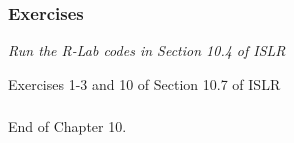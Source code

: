 \documentclass{beamer}
\begin{document}
                       
               
               
 
                      
      		\begin{frame}
      			\frametitle{Exercises  }
      			
      			
      			{\sl  Run the R-Lab codes in Section 10.4 of ISLR
      				
      				Exercises
      	 1-3  and 10 of Section  10.7 of ISLR 
      			}
      			
   
      		\end{frame}
      		
      			\begin{frame}
      				\frametitle{  }
      				
      				
      				
      				End of Chapter 10. 
      				
      				
      			\end{frame}
      
    
\end{document}
